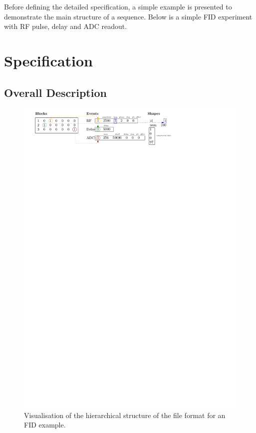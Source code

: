 \documentclass{article}
\begin{document}
Before defining the detailed specification, a simple example is presented to demonstrate the main structure of a sequence. Below is a simple FID experiment with RF pulse, delay and ADC readout.




\section{Specification}\label{sec:specification}

\subsection{Overall Description}

\begin{figure}[H]
\includegraphics[width=\columnwidth]{block_diagram}
\caption{Visualisation of the hierarchical structure of the file format for an FID example.\label{fig:block_diagram}}
\end{figure}
\end{document}
